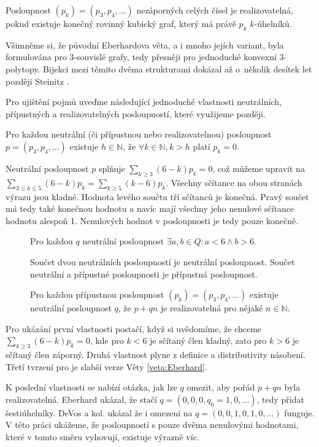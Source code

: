 \begin{definice}\label{def01:realizovatelna}
Posloupnost $(p_k) = (p_3,p_4,\dots)$ nezáporných celých čísel je realizovatelná, pokud existuje konečný rovinný kubický graf, který má právě $p_k$ $k$-úhelníků.
\end{definice}

Všimněme si, že původní Eberhardova věta, a i mnoho jejích variant, byla formulována pro 3-souvislé grafy, tedy přesněji pro jednoduché konvexní 3-polytopy. Bijekci mezi těmito dvěma strukturami dokázal až o~několik desítek let později Steinitz \cite{Steinitz}. 

Pro ujištění pojmů uveďme následující jednoduché vlastnosti neutrálních, přípustných a realizovatelných posloupností, které využijeme později.
\begin{tvrz}
Pro každou neutrální (či přípustnou nebo realizovatelnou) posloupnost $p=(p_3,p_4,\dots)$ existuje $h \in \mathbb{N}$, že $ \forall k \in \mathbb{N}, k>h $ platí $ p_k=0$.
\end{tvrz}

\begin{dukaz}
Neutrální posloupnost $p$ splňuje $\sum_{k \geq 3}{(6-k)p_k}=0$, což můžeme upravit na $\sum_{3 \leq k \leq 5}{(6-k)p_k}=\sum_{k \geq 5}{(k-6)p_k}$. Všechny sčítance na obou stranách výrazu jsou kladné. Hodnota levého součtu tří sčítanců je konečná. Pravý součet má tedy také konečnou hodnotu a navíc mají všechny jeho nenulové sčítance hodnotu alespoň 1. Nenulových hodnot v posloupnosti je tedy pouze konečně. 
\end{dukaz}

\begin{tvrz}\label{veta:posloupnosti}
\begin{description}
\item[] Pro každou $q$ neutrální posloupnost $\exists a,b \in Q : a <6 \wedge b>6$.
\item[] Součet dvou neutrálních posloupností je neutrální posloupnost. Součet neutrální a přípustné posloupnosti je přípustná posloupnost.
\item[] Pro každou přípustnou posloupnost $(p_k) = (p_3,p_4,\dots)$ existuje neutrální posloupnost $q$, že $p+qn$ je realizovatelná pro nějaké $n \in \mathbb{N}$.
\end{description}
\end{tvrz}

\begin{dukaz}
Pro ukázání první vlastnosti postačí, když si uvědomíme, že chceme $\sum_{k \geq 3}{(6-k)p_k} = 0$, kde pro $k < 6$ je sčítaný člen kladný, zato pro $k>6$ je sčítaný člen záporný. Druhá vlastnost plyne z definice a distributivity násobení. Třetí tvrzení pro je slabší verze Věty \ref{veta:Eberhard}.
\end{dukaz}
K poslední vlastnosti se nabízí otázka, jak lze $q$ omezit, aby pořád $p+qn$ byla realizovatelná. Eberhard ukázal, že stačí  $q = (0,0,0,q_6=1,0,\dots)$, tedy přidat šestiúhelníky. DeVos a kol. ukázal že i omezení na  $q = (0,0,1,0,1,0,\dots)$ funguje. V této práci ukážeme, že posloupností s pouze dvěma nenulovými hodnotami, které v tomto směru vyhovují, existuje výrazně víc.



